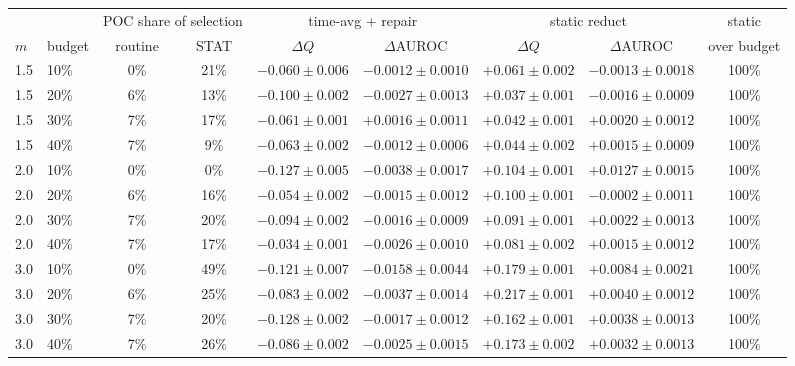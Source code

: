 \begin{tabular}{llccccccc}
\toprule
& & \multicolumn{2}{c}{POC share of selection} & \multicolumn{2}{c}{time-avg + repair} & \multicolumn{2}{c}{static reduct} & static \\
\cmidrule(lr){3-4}\cmidrule(lr){5-6}\cmidrule(lr){7-8}
$m$ & budget & routine & STAT & $\Delta Q$ & $\Delta$AUROC & $\Delta Q$ & $\Delta$AUROC & over budget \\
\midrule
1.5 & 10\% & 0\% & 21\% & $-0.060\pm0.006$ & $-0.0012\pm0.0010$ & $+0.061\pm0.002$ & $-0.0013\pm0.0018$ & 100\% \\
1.5 & 20\% & 6\% & 13\% & $-0.100\pm0.002$ & $-0.0027\pm0.0013$ & $+0.037\pm0.001$ & $-0.0016\pm0.0009$ & 100\% \\
1.5 & 30\% & 7\% & 17\% & $-0.061\pm0.001$ & $+0.0016\pm0.0011$ & $+0.042\pm0.001$ & $+0.0020\pm0.0012$ & 100\% \\
1.5 & 40\% & 7\% & 9\% & $-0.063\pm0.002$ & $-0.0012\pm0.0006$ & $+0.044\pm0.002$ & $+0.0015\pm0.0009$ & 100\% \\
2.0 & 10\% & 0\% & 0\% & $-0.127\pm0.005$ & $-0.0038\pm0.0017$ & $+0.104\pm0.001$ & $+0.0127\pm0.0015$ & 100\% \\
2.0 & 20\% & 6\% & 16\% & $-0.054\pm0.002$ & $-0.0015\pm0.0012$ & $+0.100\pm0.001$ & $-0.0002\pm0.0011$ & 100\% \\
2.0 & 30\% & 7\% & 20\% & $-0.094\pm0.002$ & $-0.0016\pm0.0009$ & $+0.091\pm0.001$ & $+0.0022\pm0.0013$ & 100\% \\
2.0 & 40\% & 7\% & 17\% & $-0.034\pm0.001$ & $-0.0026\pm0.0010$ & $+0.081\pm0.002$ & $+0.0015\pm0.0012$ & 100\% \\
3.0 & 10\% & 0\% & 49\% & $-0.121\pm0.007$ & $-0.0158\pm0.0044$ & $+0.179\pm0.001$ & $+0.0084\pm0.0021$ & 100\% \\
3.0 & 20\% & 6\% & 25\% & $-0.083\pm0.002$ & $-0.0037\pm0.0014$ & $+0.217\pm0.001$ & $+0.0040\pm0.0012$ & 100\% \\
3.0 & 30\% & 7\% & 20\% & $-0.128\pm0.002$ & $-0.0017\pm0.0012$ & $+0.162\pm0.001$ & $+0.0038\pm0.0013$ & 100\% \\
3.0 & 40\% & 7\% & 26\% & $-0.086\pm0.002$ & $-0.0025\pm0.0015$ & $+0.173\pm0.002$ & $+0.0032\pm0.0013$ & 100\% \\
\bottomrule
\end{tabular}